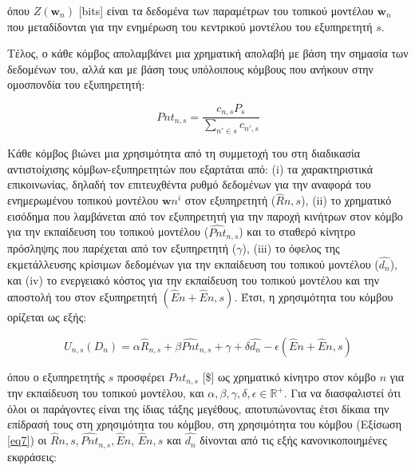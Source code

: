 \noindent
όπου $Z(\mathbf{w}_n)$ [bits] είναι τα δεδομένα των παραμέτρων του τοπικού μοντέλου $\mathbf{w}_n$ που μεταδίδονται για την ενημέρωση του κεντρικού μοντέλου του εξυπηρετητή $s$. 

Τέλος, ο κάθε κόμβος απολαμβάνει μια χρηματική απολαβή με βάση την σημασία των δεδομένων του, αλλά και με βάση τους υπόλοιπους κόμβους που ανήκουν στην ομοσπονδία του εξυπηρετητή:

\vspace{-5pt}

\begin{equation}
Pnt_{n,s}=\frac{c_{n,s}P_s}{\sum \limits_{n'\in s} c_{n',s}}
\label{eq6}
\end{equation}

\vspace{-3pt}

Κάθε κόμβος βιώνει μια χρησιμότητα από τη συμμετοχή του στη διαδικασία αντιστοίχισης κόμβων-εξυπηρετητών που εξαρτάται από: (i) τα χαρακτηριστικά επικοινωνίας, δηλαδή τον επιτευχθέντα ρυθμό δεδομένων για την αναφορά του ενημερωμένου τοπικού μοντέλου $\mathbf{w}n^i$ στον εξυπηρετητή ($\hat{R}{n,s}$), (ii) το χρηματικό εισόδημα που λαμβάνεται από τον εξυπηρετητή για την παροχή κινήτρων στον κόμβο για την εκπαίδευση του τοπικού μοντέλου ($\hat{Pnt}_{n,s}$) και το σταθερό κίνητρο πρόσληψης που παρέχεται από τον εξυπηρετητή ($\gamma$), (iii) το όφελος της εκμετάλλευσης κρίσιμων δεδομένων για την εκπαίδευση του τοπικού μοντέλου ($\hat{d_n}$), και (iv) το ενεργειακό κόστος για την εκπαίδευση του τοπικού μοντέλου και την αποστολή του στον εξυπηρετητή $(\hat{E}n+\hat{E}{n,s})$. Έτσι, η χρησιμότητα του κόμβου ορίζεται ως εξής:

\vspace{-5pt}

\begin{equation}
    U_{n,s}(D_n)=\alpha \hat{R}_{n,s} + \beta \hat{Pnt}_{n,s} +\gamma + \delta \hat{d_n} -\epsilon (\hat{E}n+\hat{E}{n,s})
    \label{eq7}
\end{equation}

\noindent
όπου ο εξυπηρετητής $s$ προσφέρει $Pnt_{n,s}$ [\$] ως χρηματικό κίνητρο στον κόμβο $n$ για την εκπαίδευση του τοπικού μοντέλου, και $\alpha, \beta, \gamma, \delta, \epsilon \in \mathbb{R}^+$. Για να διασφαλιστεί ότι όλοι οι παράγοντες είναι της ίδιας τάξης μεγέθους, αποτυπώνοντας έτσι δίκαια την επίδρασή τους στη χρησιμότητα του κόμβου, στη χρησιμότητα του κόμβου (Εξίσωση \ref{eq7}) οι $\hat{R}{n,s}, \hat{Pnt}_{n,s}, \hat{E}n$, $\hat{E}{n,s}$ και $\hat{d_n}$ δίνονται από τις εξής κανονικοποιημένες εκφράσεις:

